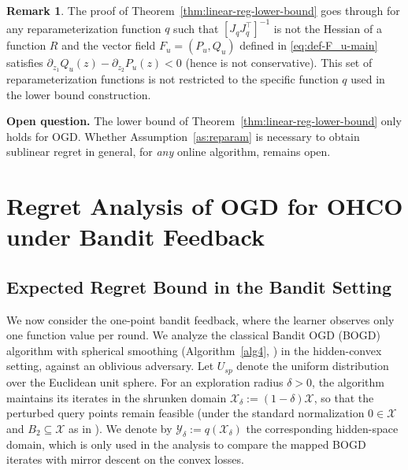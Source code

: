 \documentclass[a4paper,11pt,fullpage]{article}
\def\X{{\mathcal X}}
\def\Y{{\mathcal Y}}
\theoremstyle{plain}
\theoremstyle{definition}
\newtheorem{remark}{Remark}
\theoremstyle{plain}
\begin{document}
\begin{remark}
The proof of Theorem~\ref{thm:linear-reg-lower-bound} goes through for any reparameterization function $q$ such that $[J_qJ_q^{\top}]^{-1}$ is not the Hessian of a function $R$ and the vector field $F_u = (P_u, Q_u)$ defined in \eqref{eq:def-F_u-main} satisfies $\partial_{z_1} Q_u(z) - \partial_{z_2} P_u(z) < 0$ (hence is not conservative). This set of reparameterization functions is not restricted to the specific function $q$ used in the lower bound construction.   
\end{remark}

\noindent\textbf{Open question.} The lower bound of Theorem~\ref{thm:linear-reg-lower-bound} only holds for OGD. 
Whether Assumption~\ref{as:reparam} is necessary to obtain sublinear regret in general, for \textit{any} online algorithm, remains open. 


\section{Regret Analysis of OGD for OHCO under Bandit Feedback} 
\label{sec:bandit-feedback}

\subsection{Expected Regret Bound in the Bandit Setting}

We now consider the one-point bandit feedback, where the learner observes only one function value per round. 
We analyze the classical Bandit OGD (BOGD) algorithm with spherical smoothing (Algorithm~\ref{alg4}, \citet{flaxman-kalai-mcmahan05}) in the hidden-convex setting, against an oblivious adversary. 
Let $U_{sp}$ denote the uniform distribution over the Euclidean unit sphere. 
For an exploration radius $\delta>0$, the algorithm maintains its iterates in the shrunken domain $\X_\delta := (1-\delta)\X$, so that the perturbed query points remain feasible (under the standard normalization $0\in\X$ and $B_2\subseteq\X$ as in \citet{flaxman-kalai-mcmahan05}). 
We denote by $\Y_\delta := q(\X_\delta)$ the corresponding hidden-space domain, which is only used in the analysis to compare the mapped BOGD iterates with mirror descent on the convex losses.\\
\end{document}
